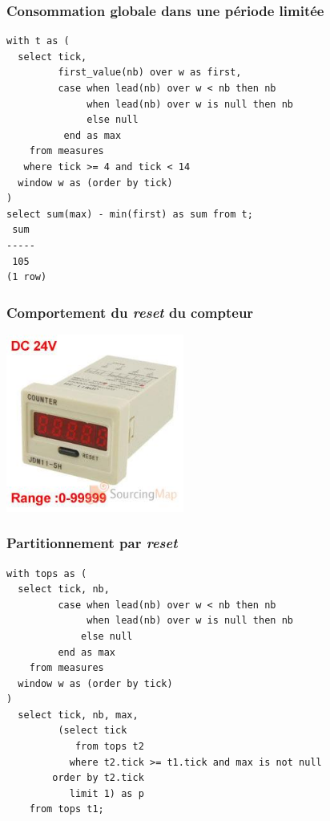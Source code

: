 \documentclass{beamer}
\begin{document}
\begin{frame}[fragile]
  \frametitle{Consommation globale dans une période limitée}

\begin{verbatim}
with t as (
  select tick,
         first_value(nb) over w as first,
         case when lead(nb) over w < nb then nb
              when lead(nb) over w is null then nb
              else null
          end as max
    from measures
   where tick >= 4 and tick < 14
  window w as (order by tick)
)
select sum(max) - min(first) as sum from t;
 sum 
-----
 105
(1 row)
\end{verbatim}
\end{frame}

\begin{frame}[fragile]
  \frametitle{Comportement du \textit{reset} du compteur}

  \begin{center}
    \includegraphics[height=2.3in]{reset-elect.jpg}
  \end{center}
  
\end{frame}

\begin{frame}[fragile]
  \frametitle{Partitionnement par \textit{reset}}

\begin{verbatim}
with tops as (
  select tick, nb,
         case when lead(nb) over w < nb then nb
              when lead(nb) over w is null then nb
             else null
         end as max
    from measures
  window w as (order by tick)
)
  select tick, nb, max,
         (select tick
            from tops t2
           where t2.tick >= t1.tick and max is not null
        order by t2.tick
           limit 1) as p
    from tops t1;
\end{verbatim}
\end{frame}
\end{document}
